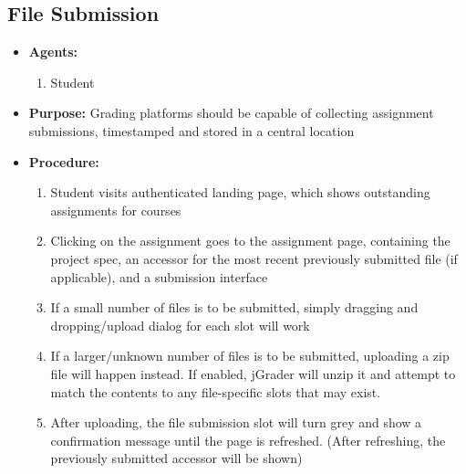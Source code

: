 \subsection{File Submission}

\begin{itemize}
  \item \textbf{Agents:}
  \begin{enumerate}
    \item Student
  \end{enumerate}
  \item \textbf{Purpose:} Grading platforms should be capable of collecting assignment submissions, timestamped and stored in a central location
  \item \textbf{Procedure:}
  \begin{enumerate}
    \item Student visits authenticated landing page, which shows outstanding assignments for courses
    \item Clicking on the assignment goes to the assignment page, containing the project spec, an accessor for the most recent previously submitted file (if applicable), and a submission interface
    \item If a small number of files is to be submitted, simply dragging and dropping/upload dialog for each slot will work
    \item If a larger/unknown number of files is to be submitted, uploading a zip file will happen instead. If enabled, jGrader will unzip it and attempt to match the contents to any file-specific slots that may exist.
    \item After uploading, the file submission slot will turn grey and show a confirmation message until the page is refreshed. (After refreshing, the previously submitted accessor will be shown)
  \end{enumerate}
\end{itemize}
